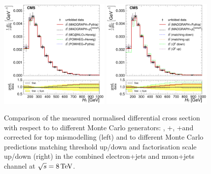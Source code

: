 \begin{figure}[hbtp]
    \centering
     \includegraphics[width=0.48\textwidth]{Chapters/04_Analysis/04b_XSections/images/results/8TeV/HT/central/normalised_xsection_combined_different_generators.pdf}\hfill
     \includegraphics[width=0.48\textwidth]{Chapters/04_Analysis/04b_XSections/images/results/8TeV/HT/central/normalised_xsection_combined_systematics_shifts.pdf}\hfill
     \caption{Comparison of the measured normalised differential cross section with respect to \HT to
     different Monte Carlo generators: \MADGRAPH, \POWHEG+\HERWIG, \POWHEG+\PYTHIA and \MADGRAPH corrected for
     top \pt mismodelling (left) and to different Monte Carlo predictions matching threshold up/down and
     factorisation scale up/down (right) in the combined electron+jets and muon+jets channel at
     $\sqrt{s}=8\,\text{Te\hspace{-.08em}V}$.}
     \label{fig:result_HT_8TeV_combined}
\end{figure}

